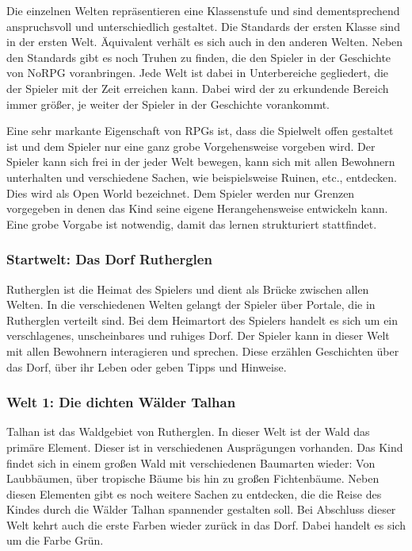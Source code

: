 Die einzelnen Welten repräsentieren eine Klassenstufe und sind dementsprechend anspruchsvoll und unterschiedlich gestaltet. Die Standards der ersten Klasse sind in der ersten Welt. Äquivalent verhält es sich auch in den anderen Welten. Neben den Standards gibt es noch Truhen zu finden, die den Spieler in der Geschichte von NoRPG voranbringen. Jede Welt ist dabei in Unterbereiche gegliedert, die der Spieler mit der Zeit erreichen kann. Dabei wird der zu erkundende Bereich immer größer, je weiter der Spieler in der Geschichte vorankommt. 

Eine sehr markante Eigenschaft von RPGs ist, dass die Spielwelt offen gestaltet ist und dem Spieler nur eine ganz grobe Vorgehensweise vorgeben wird. Der Spieler kann sich frei in der jeder Welt bewegen, kann sich mit allen Bewohnern unterhalten und verschiedene Sachen, wie beispielsweise Ruinen, etc., entdecken. Dies wird als Open World bezeichnet. Dem Spieler werden nur Grenzen vorgegeben in denen das Kind seine eigene Herangehensweise entwickeln kann. Eine grobe Vorgabe ist notwendig, damit das lernen strukturiert stattfindet.

\subsubsection{Startwelt: Das Dorf Rutherglen}
	Rutherglen ist die Heimat des Spielers und dient als Brücke zwischen allen Welten. In die verschiedenen Welten gelangt der Spieler über Portale, die in Rutherglen verteilt sind. Bei dem Heimartort des Spielers handelt es sich um ein verschlagenes, unscheinbares und ruhiges Dorf. Der Spieler kann in dieser Welt mit allen Bewohnern interagieren und sprechen. Diese erzählen Geschichten über das Dorf, über ihr Leben oder geben Tipps und Hinweise.
	
\subsubsection{Welt 1: Die dichten Wälder Talhan}
	Talhan ist das Waldgebiet von Rutherglen. In dieser Welt ist der Wald das primäre Element. Dieser ist in verschiedenen Ausprägungen vorhanden. Das Kind findet sich in einem großen Wald mit verschiedenen Baumarten wieder: Von Laubbäumen, über tropische Bäume bis hin zu großen Fichtenbäume. Neben diesen Elementen gibt es noch weitere Sachen zu entdecken, die die Reise des Kindes durch die Wälder Talhan spannender gestalten soll. Bei Abschluss dieser Welt kehrt auch die erste Farben wieder zurück in das Dorf. Dabei handelt es sich um die Farbe Grün.
	
